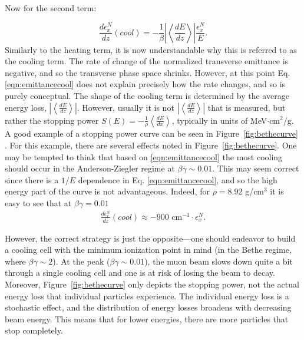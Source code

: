 \fi

Now for the second term:

\begin{equation}
\label{eqn:emittancecool}
\frac{d\epsilon_x^N}{dz}(cool)=-\frac{1}{\beta}\left| \left<\frac{dE}{dz}\right>\right| \frac{\epsilon_x^N}{E}.
\end{equation}
Similarly to the heating term, it is now understandable why this is referred to as the cooling term. The rate of change of the normalized transverse emittance is negative, and so the transverse phase space shrinks. However, at this point Eq. \eqref{eqn:emittancecool} does not explain precisely how the rate changes, and so is purely conceptual. The shape of the cooling term is determined by the average energy loss, $\left|\left<\frac{dE}{dz}\right>\right|$. However, usually it is not $\left|\left<\frac{dE}{dz}\right>\right|$ that is measured, but rather the stopping power $S(E)=-\frac{1}{\rho}\left<\frac{dE}{dx}\right>$, typically in units of MeV$\cdot$cm$^2$/g. A good example of a stopping power curve can be seen in Figure~\ref{fig:bethecurve} \cite{PDG}. For this example, there are several effects noted in Figure~\ref{fig:bethecurve}. One may be tempted to think that based on \ref{eqn:emittancecool} the most cooling should occur in the Anderson-Ziegler regime at $\beta\gamma\sim0.01$. This may seem correct since there is a $1/E$ dependence in Eq. \eqref{eqn:emittancecool}, and so the high energy part of the curve is not advantageous. Indeed, for $\rho= 8.92$ g/cm$^3$ it is easy to see that at $\beta\gamma=0.01$ 
\begin{align*}
\frac{d\epsilon_x^N}{dz}(cool)\approx-900 \text{ cm}^{-1} \cdot \epsilon_x^N.
\end{align*}

However, the correct strategy is just the opposite---one should endeavor to build a cooling cell with the minimum ionization point in mind (in the Bethe regime, where $\beta\gamma\sim2$). At the peak ($\beta\gamma\sim0.01$), the muon beam slows down quite a bit through a single cooling cell and one is at risk of losing the beam to decay. Moreover, Figure~\ref{fig:bethecurve} only depicts the stopping power, not the actual energy loss that individual particles experience. The individual energy loss is a stochastic effect, and the distribution of energy losses broadens with decreasing beam energy. This means that for lower energies, there are more particles that stop completely. 
\iffalse



